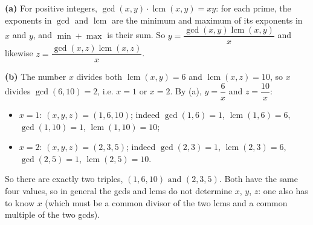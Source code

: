 \textbf{(a)} For positive integers, $\gcd(x,y)\cdot\operatorname{lcm}(x,y)=xy$: for each prime, the exponents in $\gcd$ and $\operatorname{lcm}$ are the minimum and maximum of its exponents in $x$ and $y$, and $\min+\max$ is their sum. So $y=\dfrac{\gcd(x,y)\operatorname{lcm}(x,y)}{x}$ and likewise $z=\dfrac{\gcd(x,z)\operatorname{lcm}(x,z)}{x}$.

\textbf{(b)} The number $x$ divides both $\operatorname{lcm}(x,y)=6$ and $\operatorname{lcm}(x,z)=10$, so $x$ divides $\gcd(6,10)=2$, i.e. $x=1$ or $x=2$. By (a), $y=\dfrac6x$ and $z=\dfrac{10}x$:
\begin{itemize}
\item $x=1$: $(x,y,z)=(1,6,10)$; indeed $\gcd(1,6)=1$, $\operatorname{lcm}(1,6)=6$, $\gcd(1,10)=1$, $\operatorname{lcm}(1,10)=10$;
\item $x=2$: $(x,y,z)=(2,3,5)$; indeed $\gcd(2,3)=1$, $\operatorname{lcm}(2,3)=6$, $\gcd(2,5)=1$, $\operatorname{lcm}(2,5)=10$.
\end{itemize}
So there are exactly two triples, $\boxed{(1,6,10)\text{ and }(2,3,5)}$. Both have the same four values, so in general the gcds and lcms do not determine $x$, $y$, $z$: one also has to know $x$ (which must be a common divisor of the two lcms and a common multiple of the two gcds).
